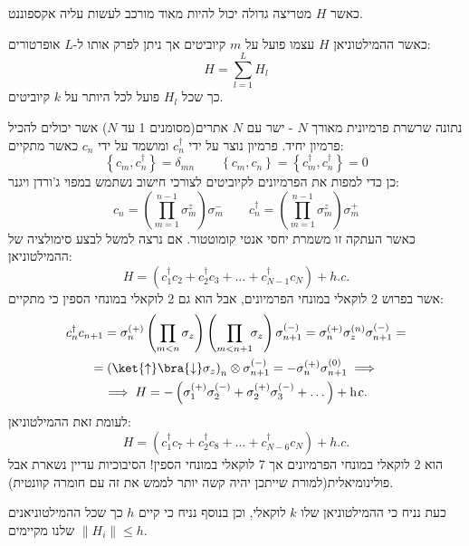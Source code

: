 \documentclass{tstextbook}
\begin{document}
כאשר \(H\) מטריצה גדולה יכול להיות מאוד מורכב לעשות עליה אקספוננט. 

\begin{definition}
כאשר ההמילטוניאן \(H\) עצמו פועל על \(m\) קיוביטים אך ניתן לפרק אותו ל-\(L\) אופרטורים:
$$H=\sum_{l=1}^{L}H_{l}$$
כך שכל \(H_{l}\) פועל לכל היותר על \(k\) קיוביטים.

\end{definition}
\begin{example}
נתונה שרשרת פרמיונית מאורך \(N\) - ישר עם \(N\) אתרים(מסומנים 1 עד \(N\)) אשר יכולים להכיל פרמיון יחיד. פרמיון נוצר על ידי \(c_{n}^{\dagger}\) ומושמד על ידי \(c_{n}\) כאשר מתקיים:
$$\left\{  c_{m},c_{n}^{\dagger}  \right\}=\delta_{mn}\qquad \left\{c_{m},c_{n}\right\}=\left\{c_{m}^{\dagger},c_{n}^{\dagger}\right\}=0$$
כן כדי למפות את הפרמיונים לקיוביטים לצורכי חישוב נשתמש במפוי ג'ורדן ויגנר:
$$c_{n}=\left(\prod_{m=1}^{n-1}\sigma_{m}^{z}\right)\sigma_{m}^{-}\qquad c_{n}^{\dagger}=\left(\prod_{m=1}^{n-1}\sigma_{m}^{z}\right)\sigma_{m}^{+}$$
כאשר העתקה זו משמרת יחסי אנטי קומוטטור. אם נרצה למשל לבצע סימולציה של ההמילטוניאן:
$$H=\left(c_{1}^{\dagger}c_{2}+c_{2}^{\dagger}c_{3}+\ldots+c_{N-1}^{\dagger}c_{N}\right)+h.c.$$
אשר בפרוש 2 לוקאלי במונחי הפרמיונים, אבל הוא גם 2 לוקאלי במונחי הספין כי מתקיים:
$$\begin{gather}c_{n}^{\dagger}c_{n+1}=\sigma^{(+)}_{n}\left( \prod_{m<n}\sigma_{z} \right)\left( \prod_{m<n+1}\!\!\sigma_{z} \right)\sigma_{n+1}^{(-)}=\sigma_{n}^{(+)}\sigma_{z}^{(n)}\sigma_{n+1}^{(-)} = \\=\left( \ket{\uparrow } \bra{\downarrow } \sigma_{z} \right)_{n}\otimes \sigma_{n+1}^{(-)}=-\sigma_{n}^{(+)}\sigma_{n+1}^{(0)}\implies \\\implies H=-\left( \sigma_{1}^{(+)}\sigma_{2}^{(-)}+\sigma_{2}^{(+)}\sigma_{3}^{(-)} +\dots \right)+ \mathrm{h.\!c.}
\end{gather}$$
לעומת זאת ההמילטוניאן:
$$H=\left(c_{1}^{\dagger}c_{7}+c_{2}^{\dagger}c_{8}+\ldots+c_{N-6}^{\dagger}c_{N}\right)+h.c.$$
הוא 2 לוקאלי במונחי הפרמיונים אך 7 לוקאלי במונחי הספין! הסיבוכיות עדיין נשארת אבל פולינומיאלית(למורת שייתכן יהיה קשה יותר לממש את זה עם חומרה קוונטית).

\end{example}
כעת נניח כי ההמילטוניאן שלו \(k\) לוקאלי, וכן בנוסף נניח כי קיים \(h\) כך שכל ההמילטוניאנים שלנו מקיימים \(\lVert H_{i} \rVert\leq h\).
\end{document}
